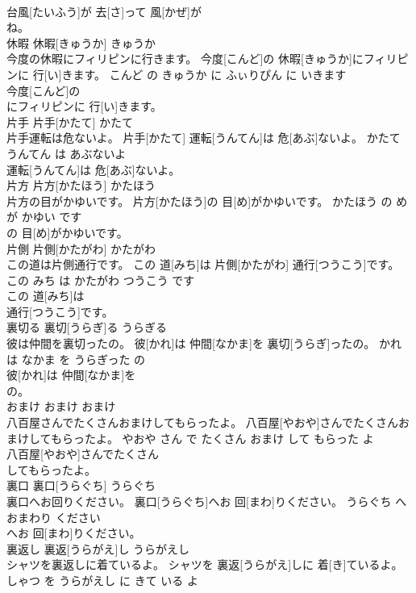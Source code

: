 \documentclass[8pt]{extreport}
\begin{document}
\begin{CJK}{UTF8}{min}
\\	台風[たいふう]が 去[さ]って 風[かぜ]が
\\	ね。			
\\	休暇	休暇[きゅうか]	きゅうか	
\\	今度の休暇にフィリピンに行きます。	今度[こんど]の 休暇[きゅうか]にフィリピンに 行[い]きます。	こんど の きゅうか に ふぃりぴん に いきます	
\\	今度[こんど]の
\\	にフィリピンに 行[い]きます。			
\\	片手	片手[かたて]	かたて	
\\	片手運転は危ないよ。	片手[かたて] 運転[うんてん]は 危[あぶ]ないよ。	かたて うんてん は あぶないよ	
\\	運転[うんてん]は 危[あぶ]ないよ。			
\\	片方	片方[かたほう]	かたほう	
\\	片方の目がかゆいです。	片方[かたほう]の 目[め]がかゆいです。	かたほう の め が かゆい です	
\\	の 目[め]がかゆいです。			
\\	片側	片側[かたがわ]	かたがわ	
\\	この道は片側通行です。	この 道[みち]は 片側[かたがわ] 通行[つうこう]です。	この みち は かたがわ つうこう です	
\\	この 道[みち]は
\\	通行[つうこう]です。			
\\	裏切る	裏切[うらぎ]る	うらぎる	
\\	彼は仲間を裏切ったの。	彼[かれ]は 仲間[なかま]を 裏切[うらぎ]ったの。	かれ は なかま を うらぎった の	
\\	彼[かれ]は 仲間[なかま]を
\\	の。			
\\	おまけ	おまけ	おまけ	
\\	八百屋さんでたくさんおまけしてもらったよ。	八百屋[やおや]さんでたくさんおまけしてもらったよ。	やおや さん で たくさん おまけ して もらった よ	
\\	八百屋[やおや]さんでたくさん
\\	してもらったよ。			
\\	裏口	裏口[うらぐち]	うらぐち	
\\	裏口へお回りください。	裏口[うらぐち]へお 回[まわ]りください。	うらぐち へ おまわり ください	
\\	へお 回[まわ]りください。			
\\	裏返し	裏返[うらがえ]し	うらがえし	
\\	シャツを裏返しに着ているよ。	シャツを 裏返[うらがえ]しに 着[き]ているよ。	しゃつ を うらがえし に きて いる よ	

\end{CJK}
\end{document}
